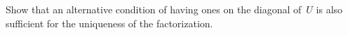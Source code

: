   Show that an alternative condition of having ones on the diagonal of~$U$
  is also sufficient for the uniqueness of the factorization.
